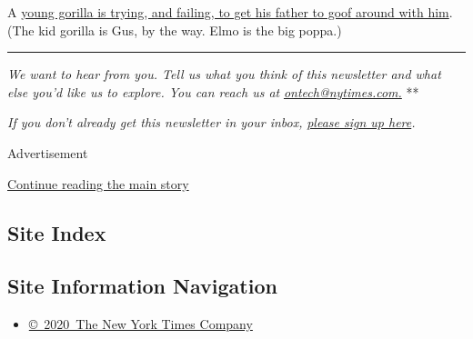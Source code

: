 A
\href{https://www.facebook.com/FortWorthZoo/videos/422445615335977/}{young
gorilla is trying, and failing, to get his father to goof around with
him}. (The kid gorilla is Gus, by the way. Elmo is the big poppa.)

\begin{center}\rule{0.5\linewidth}{\linethickness}\end{center}

\emph{We want to hear from you. Tell us what you think of this
newsletter and what else you'd like us to explore. You can reach us at}
\href{mailto:ontech@nytimes.com?subject=On\%20Tech\%20Feedback}{\emph{ontech@nytimes.com.}}
**

\emph{If you don't already get this newsletter in your inbox,}
\href{https://www.nytimes.com/newsletters/signup/OT}{\emph{please sign
up here}}\emph{.}

Advertisement

\protect\hyperlink{after-bottom}{Continue reading the main story}

\hypertarget{site-index}{%
\subsection{Site Index}\label{site-index}}

\hypertarget{site-information-navigation}{%
\subsection{Site Information
Navigation}\label{site-information-navigation}}

\begin{itemize}
\tightlist
\item
  \href{https://help.nytimes.com/hc/en-us/articles/115014792127-Copyright-notice}{©~2020~The
  New York Times Company}
\end{itemize}

